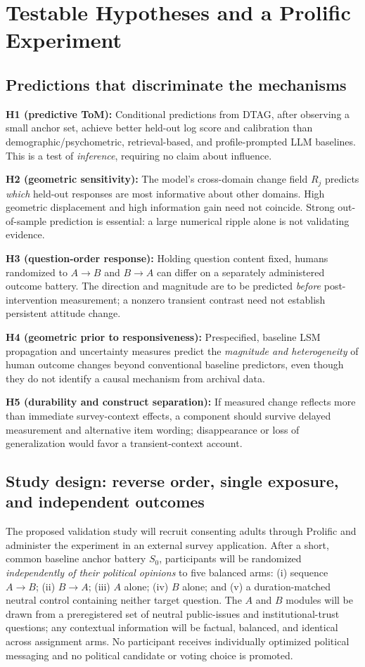 \documentclass[journal,10pt]{IEEEtran}
\begin{document}



\section{Testable Hypotheses and a Prolific Experiment}
\subsection{Predictions that discriminate the mechanisms}
\textbf{H1 (predictive ToM):} Conditional predictions from DTAG, after observing a small anchor set, achieve better held-out log score and calibration than demographic/psychometric, retrieval-based, and profile-prompted LLM baselines. This is a test of \emph{inference}, requiring no claim about influence.

\textbf{H2 (geometric sensitivity):} The model's cross-domain change field $R_j$ predicts \emph{which} held-out responses are most informative about other domains. High geometric displacement and high information gain need not coincide. Strong out-of-sample prediction is essential: a large numerical ripple alone is not validating evidence.

\textbf{H3 (question-order response):} Holding question content fixed, humans randomized to $A\to B$ and $B\to A$ can differ on a separately administered outcome battery. The direction and magnitude are to be predicted \emph{before} post-intervention measurement; a nonzero transient contrast need not establish persistent attitude change.

\textbf{H4 (geometric prior to responsiveness):} Prespecified, baseline LSM propagation and uncertainty measures predict the \emph{magnitude and heterogeneity} of human outcome changes beyond conventional baseline predictors, even though they do not identify a causal mechanism from archival data.

\textbf{H5 (durability and construct separation):} If measured change reflects more than immediate survey-context effects, a component should survive delayed measurement and alternative item wording; disappearance or loss of generalization would favor a transient-context account.

\subsection{Study design: reverse order, single exposure, and independent outcomes}
The proposed validation study will recruit consenting adults through Prolific and administer the experiment in an external survey application. After a short, common baseline anchor battery $S_0$, participants will be randomized \emph{independently of their political opinions} to five balanced arms: (i) sequence $A\to B$; (ii) $B\to A$; (iii) $A$ alone; (iv) $B$ alone; and (v) a duration-matched neutral control containing neither target question. The $A$ and $B$ modules will be drawn from a preregistered set of neutral public-issues and institutional-trust questions; any contextual information will be factual, balanced, and identical across assignment arms. No participant receives individually optimized political messaging and no political candidate or voting choice is promoted.
\end{document}
